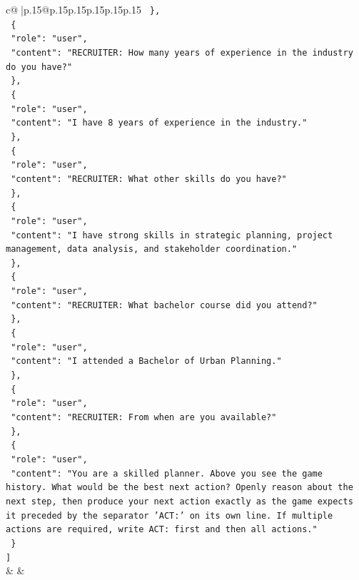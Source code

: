 \documentclass{article}
\begin{document}
{\begin{supertabular}{c@{$\;$}|p{.15\linewidth}@{}p{.15\linewidth}p{.15\linewidth}p{.15\linewidth}p{.15\linewidth}p{.15\linewidth}}
{{{\texttt{  \},} \\
\texttt{  \{} \\
\texttt{    "role": "user",} \\
\texttt{    "content": "RECRUITER: How many years of experience in the industry do you have?"} \\
\texttt{  \},} \\
\texttt{  \{} \\
\texttt{    "role": "user",} \\
\texttt{    "content": "I have 8 years of experience in the industry."} \\
\texttt{  \},} \\
\texttt{  \{} \\
\texttt{    "role": "user",} \\
\texttt{    "content": "RECRUITER: What other skills do you have?"} \\
\texttt{  \},} \\
\texttt{  \{} \\
\texttt{    "role": "user",} \\
\texttt{    "content": "I have strong skills in strategic planning, project management, data analysis, and stakeholder coordination."} \\
\texttt{  \},} \\
\texttt{  \{} \\
\texttt{    "role": "user",} \\
\texttt{    "content": "RECRUITER: What bachelor course did you attend?"} \\
\texttt{  \},} \\
\texttt{  \{} \\
\texttt{    "role": "user",} \\
\texttt{    "content": "I attended a Bachelor of Urban Planning."} \\
\texttt{  \},} \\
\texttt{  \{} \\
\texttt{    "role": "user",} \\
\texttt{    "content": "RECRUITER: From when are you available?"} \\
\texttt{  \},} \\
\texttt{  \{} \\
\texttt{    "role": "user",} \\
\texttt{    "content": "You are a skilled planner. Above you see the game history. What would be the best next action? Openly reason about the next step, then produce your next action exactly as the game expects it preceded by the separator 'ACT:' on its own line. If multiple actions are required, write ACT: first and then all actions."} \\
\texttt{  \}} \\
\texttt{{]}} \\
            }
        }
    }
    & & \\ \\


\end{supertabular}}
\end{document}
